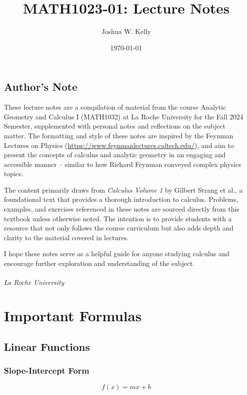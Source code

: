 \documentclass{book}
\title{MATH1023-01: Lecture Notes}
\author{Joshua W. Kelly}
\date{\today}
\begin{document}
\maketitle


\section*{Author's Note}
These lecture notes are a compilation of material from the course Analytic Geometry and Calculus I (MATH1032) at La Roche University for the Fall 2024 Semester, supplemented with personal notes and reflections on the subject matter. The formatting and style of these notes are inspired by the Feynman Lectures on Physics (\url{https://www.feynmanlectures.caltech.edu/}), and aim to present the concepts of calculus and analytic geometry in an engaging and accessible manner -- similar to how Richard Feynman conveyed complex physics topics.

The content primarily draws from \textit{Calculus Volume 1} by Gilbert Strang et al.\cite{strang_calculus_2016}, a foundational text that provides a thorough introduction to calculus. Problems, examples, and exercises referenced in these notes are sourced directly from this textbook unless otherwise noted. The intention is to provide students with a resource that not only follows the course curriculum but also adds depth and clarity to the material covered in lectures.

I hope these notes serve as a helpful guide for anyone studying calculus and encourage further exploration and understanding of the subject.\\

 \\
\textit{La Roche University} \\ 

\tableofcontents

\newpage

\chapter{Important Formulas}
\section{Linear Functions}
\subsection{Slope-Intercept Form}
\begin{equation}
    f(x) = mx + b
\end{equation}
\end{document}
